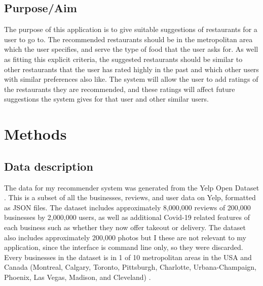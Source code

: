 \documentclass[conference]{IEEEtran}
\begin{document}
\subsection{Purpose/Aim}
The purpose of this application is to give suitable suggestions of restaurants for a user to go to. 
The recommended restaurants should be in the metropolitan area which the user specifies, and serve the 
type of food that the user asks for. 
As well as fitting this explicit criteria, the suggested restaurants should be similar to other restaurants 
that the user has rated highly in the past and which other users with similar preferences also like. 
The system will allow the user to add ratings of the restaurants they are recommended, and these ratings will 
affect future suggestions the system gives for that user and other similar users. 


\section{Methods}

\subsection{Data description}
The data for my recommender system was generated from the Yelp Open Dataset \cite{YelpDataset}. 
This is a subset of all the businesses, reviews, and user data on Yelp, formatted as JSON files. 
The dataset includes approximately 8,000,000 reviews of 200,000 businesses by 2,000,000 users, as well as 
additional Covid-19 related features of each business such as whether they now offer takeout or delivery. 
The dataset also includes approximately 200,000 photos but I these are not relevant to my application, since 
the interface is command line only, so they were discarded. 
Every businesses in the dataset is in 1 of 10 metropolitan areas in the USA and Canada 
(Montreal, Calgary, Toronto, Pittsburgh, Charlotte, Urbana-Champaign, Phoenix, Las Vegas, Madison, and Cleveland) \cite{YelpDataset}. 
\end{document}
